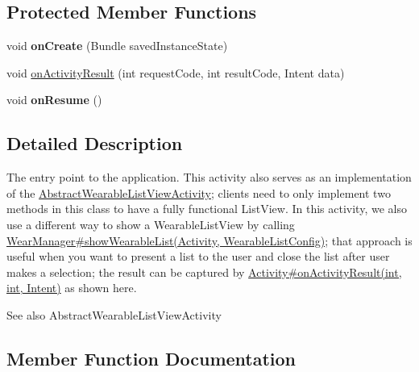 \subsection*{Protected Member Functions}
\begin{DoxyCompactItemize}
\item 
void {\bfseries on\+Create} (Bundle saved\+Instance\+State)\hypertarget{classcom_1_1example_1_1android_1_1wearable_1_1wcldemo_1_1MyListActivity_a530a0f5d09f7d5636a5e90f7fccbf055}{}\label{classcom_1_1example_1_1android_1_1wearable_1_1wcldemo_1_1MyListActivity_a530a0f5d09f7d5636a5e90f7fccbf055}

\item 
void \hyperlink{classcom_1_1example_1_1android_1_1wearable_1_1wcldemo_1_1MyListActivity_ac9367639e40812209a7d0e4df226a845}{on\+Activity\+Result} (int request\+Code, int result\+Code, Intent data)
\item 
void {\bfseries on\+Resume} ()\hypertarget{classcom_1_1example_1_1android_1_1wearable_1_1wcldemo_1_1MyListActivity_adc017146a7a2ad1766456f5d5931b9b5}{}\label{classcom_1_1example_1_1android_1_1wearable_1_1wcldemo_1_1MyListActivity_adc017146a7a2ad1766456f5d5931b9b5}

\end{DoxyCompactItemize}


\subsection{Detailed Description}
The entry point to the application. This activity also serves as an implementation of the \hyperlink{}{Abstract\+Wearable\+List\+View\+Activity}; clients need to only implement two methods in this class to have a fully functional List\+View. In this activity, we also use a different way to show a Wearable\+List\+View by calling \hyperlink{classcom_1_1google_1_1devrel_1_1wcl_1_1WearManager_a446c9ae3e23609bc16d87e4ece91ed72}{Wear\+Manager\#show\+Wearable\+List(\+Activity, Wearable\+List\+Config)}; that approach is useful when you want to present a list to the user and close the list after user makes a selection; the result can be captured by \hyperlink{}{Activity\#on\+Activity\+Result(int, int, Intent)} as shown here.

\begin{DoxySeeAlso}{See also}
Abstract\+Wearable\+List\+View\+Activity 
\end{DoxySeeAlso}


\subsection{Member Function Documentation}
